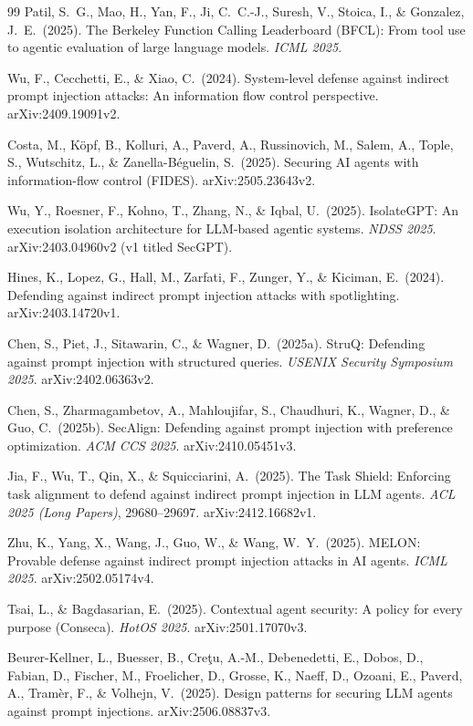\documentclass[10pt,twocolumn]{article}
\begin{document}
\begin{thebibliography}{99}
Patil, S.~G., Mao, H., Yan, F., Ji, C.~C.-J., Suresh, V., Stoica, I., \&
Gonzalez, J.~E.\ (2025).
The Berkeley Function Calling Leaderboard (BFCL): From tool use to agentic
evaluation of large language models.
\emph{ICML 2025}.

Wu, F., Cecchetti, E., \& Xiao, C.\ (2024).
System-level defense against indirect prompt injection attacks: An
information flow control perspective.
arXiv:2409.19091v2.

Costa, M., K\"opf, B., Kolluri, A., Paverd, A., Russinovich, M., Salem, A.,
Tople, S., Wutschitz, L., \& Zanella-B\'eguelin, S.\ (2025).
Securing AI agents with information-flow control (FIDES).
arXiv:2505.23643v2.

Wu, Y., Roesner, F., Kohno, T., Zhang, N., \& Iqbal, U.\ (2025).
IsolateGPT: An execution isolation architecture for LLM-based agentic
systems.
\emph{NDSS 2025}. arXiv:2403.04960v2 (v1 titled SecGPT).

Hines, K., Lopez, G., Hall, M., Zarfati, F., Zunger, Y., \& Kiciman, E.\ (2024).
Defending against indirect prompt injection attacks with spotlighting.
arXiv:2403.14720v1.

Chen, S., Piet, J., Sitawarin, C., \& Wagner, D.\ (2025a).
StruQ: Defending against prompt injection with structured queries.
\emph{USENIX Security Symposium 2025}. arXiv:2402.06363v2.

Chen, S., Zharmagambetov, A., Mahloujifar, S., Chaudhuri, K., Wagner, D.,
\& Guo, C.\ (2025b).
SecAlign: Defending against prompt injection with preference optimization.
\emph{ACM CCS 2025}. arXiv:2410.05451v3.

Jia, F., Wu, T., Qin, X., \& Squicciarini, A.\ (2025).
The Task Shield: Enforcing task alignment to defend against indirect prompt
injection in LLM agents.
\emph{ACL 2025 (Long Papers)}, 29680--29697. arXiv:2412.16682v1.

Zhu, K., Yang, X., Wang, J., Guo, W., \& Wang, W.~Y.\ (2025).
MELON: Provable defense against indirect prompt injection attacks in AI
agents.
\emph{ICML 2025}. arXiv:2502.05174v4.

Tsai, L., \& Bagdasarian, E.\ (2025).
Contextual agent security: A policy for every purpose (Conseca).
\emph{HotOS 2025}. arXiv:2501.17070v3.

Beurer-Kellner, L., Buesser, B., Cre\c{t}u, A.-M., Debenedetti, E., Dobos, D.,
Fabian, D., Fischer, M., Froelicher, D., Grosse, K., Naeff, D., Ozoani, E.,
Paverd, A., Tram\`er, F., \& Volhejn, V.\ (2025).
Design patterns for securing LLM agents against prompt injections.
arXiv:2506.08837v3.


\end{thebibliography}
\end{document}
